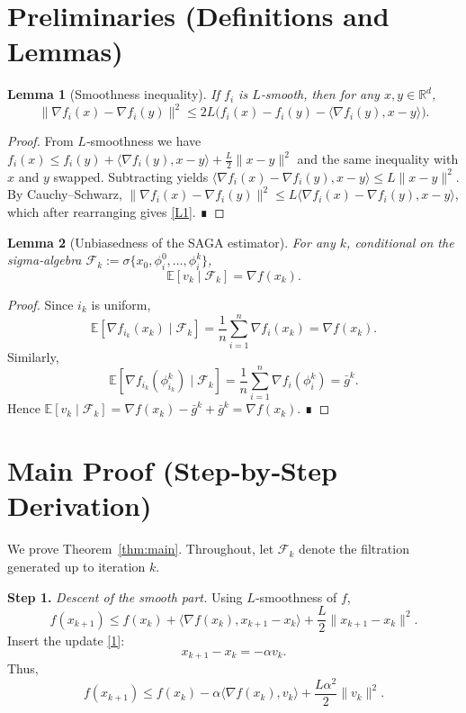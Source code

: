 \documentclass[11pt]{article}
\newtheorem{lemma}{Lemma}
\newcommand{\EE}{\mathbb{E}}
\newcommand{\RR}{\mathbb{R}}
\newcommand{\grad}{\nabla}
\begin{document}
\newpage
\section*{Preliminaries (Definitions and Lemmas)}
\begin{lemma}[Smoothness inequality]\label{lem:smooth}
If $f_i$ is $L$‑smooth, then for any $x,y\in\RR^{d}$,
\[
\|\grad f_i(x)-\grad f_i(y)\|^{2}\le 2L\big(f_i(x)-f_i(y)-\langle\grad f_i(y),x-y\rangle\big).
\tag{L1}
\]
\end{lemma}
\begin{proof}
From $L$‑smoothness we have 
$f_i(x)\le f_i(y)+\langle\grad f_i(y),x-y\rangle+\frac{L}{2}\|x-y\|^{2}$
and the same inequality with $x$ and $y$ swapped. Subtracting yields
$\langle\grad f_i(x)-\grad f_i(y),x-y\rangle\le L\|x-y\|^{2}$.  
By Cauchy–Schwarz,
$\|\grad f_i(x)-\grad f_i(y)\|^{2}\le L\langle\grad f_i(x)-\grad f_i(y),x-y\rangle$,
which after rearranging gives \eqref{L1}. ∎
\end{proof}

\begin{lemma}[Unbiasedness of the SAGA estimator]\label{lem:unbiased}
For any $k$, conditional on the sigma‑algebra $\mathcal{F}_k:=\sigma\{x_0,\phi_i^0,\dots,\phi_i^k\}$,
\[
\EE\!\left[v_k\mid\mathcal{F}_k\right]=\grad f(x_k).
\tag{L2}
\]
\end{lemma}
\begin{proof}
Since $i_k$ is uniform,
\[
\EE\!\left[\grad f_{i_k}(x_k)\mid\mathcal{F}_k\right]=\frac1n\sum_{i=1}^{n}\grad f_i(x_k)=\grad f(x_k).
\]
Similarly,
\[
\EE\!\left[\grad f_{i_k}(\phi_{i_k}^k)\mid\mathcal{F}_k\right]=\frac1n\sum_{i=1}^{n}\grad f_i(\phi_i^k)=\bar g^k .
\]
Hence $\EE[v_k\mid\mathcal{F}_k]=\grad f(x_k)-\bar g^k+\bar g^k=\grad f(x_k)$. ∎
\end{proof}

\section*{Main Proof (Step‑by‑Step Derivation)}
We prove Theorem~\ref{thm:main}.  Throughout, let $\mathcal{F}_k$ denote the filtration generated up to iteration $k$.

\noindent\textbf{Step 1.} \emph{Descent of the smooth part.} Using $L$‑smoothness of $f$,
\[
f(x_{k+1})\le f(x_k)+\langle\grad f(x_k),x_{k+1}-x_k\rangle+\frac{L}{2}\|x_{k+1}-x_k\|^{2}.
\tag{3}
\]
Insert the update \eqref{1}:
\[
x_{k+1}-x_k=-\alpha v_k.
\]
Thus,
\[
f(x_{k+1})\le f(x_k)-\alpha\langle\grad f(x_k),v_k\rangle+\frac{L\alpha^{2}}{2}\|v_k\|^{2}.
\tag{4}
\]
\end{document}
